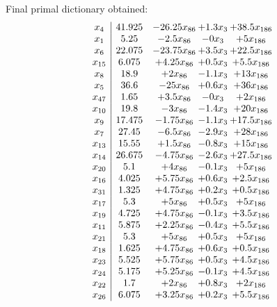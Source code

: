 \documentclass[11pt]{article}
\begin{document}
 Final primal dictionary obtained: 
\[\begin{array}{c| c c@{\hskip 2pt} c@{\hskip 2pt} c@{\hskip 2pt} }
 x_{4}   &  41.925 & -26.25 x_{86} & + 1.3 x_{3} & + 38.5 x_{186}\\
 x_{1}   &  5.25 & -2.5 x_{86} & -0 x_{3} & + 5 x_{186}\\
 x_{6}   &  22.075 & -23.75 x_{86} & + 3.5 x_{3} & + 22.5 x_{186}\\
 x_{15}   &  6.075 & + 4.25 x_{86} & + 0.5 x_{3} & + 5.5 x_{186}\\
 x_{8}   &  18.9 & + 2 x_{86} & -1.1 x_{3} & + 13 x_{186}\\
 x_{5}   &  36.6 & -25 x_{86} & + 0.6 x_{3} & + 36 x_{186}\\
 x_{47}   &  1.65 & + 3.5 x_{86} & -0 x_{3} & + 2 x_{186}\\
 x_{10}   &  19.8 & -3 x_{86} & -1.4 x_{3} & + 20 x_{186}\\
 x_{9}   &  17.475 & -1.75 x_{86} & -1.1 x_{3} & + 17.5 x_{186}\\
 x_{7}   &  27.45 & -6.5 x_{86} & -2.9 x_{3} & + 28 x_{186}\\
 x_{13}   &  15.55 & + 1.5 x_{86} & -0.8 x_{3} & + 15 x_{186}\\
 x_{14}   &  26.675 & -4.75 x_{86} & -2.6 x_{3} & + 27.5 x_{186}\\
 x_{20}   &  5.1 & + 4 x_{86} & -0.1 x_{3} & + 5 x_{186}\\
 x_{16}   &  4.025 & + 5.75 x_{86} & + 0.6 x_{3} & + 2.5 x_{186}\\
 x_{31}   &  1.325 & + 4.75 x_{86} & + 0.2 x_{3} & + 0.5 x_{186}\\
 x_{17}   &  5.3 & + 5 x_{86} & + 0.5 x_{3} & + 5 x_{186}\\
 x_{19}   &  4.725 & + 4.75 x_{86} & -0.1 x_{3} & + 3.5 x_{186}\\
 x_{11}   &  5.875 & + 2.25 x_{86} & -0.4 x_{3} & + 5.5 x_{186}\\
 x_{21}   &  5.3 & + 5 x_{86} & + 0.5 x_{3} & + 5 x_{186}\\
 x_{18}   &  1.625 & + 4.75 x_{86} & + 0.6 x_{3} & + 0.5 x_{186}\\
 x_{23}   &  5.525 & + 5.75 x_{86} & + 0.5 x_{3} & + 4.5 x_{186}\\
 x_{24}   &  5.175 & + 5.25 x_{86} & -0.1 x_{3} & + 4.5 x_{186}\\
 x_{22}   &  1.7 & + 2 x_{86} & + 0.8 x_{3} & + 2 x_{186}\\
 x_{26}   &  6.075 & + 3.25 x_{86} & + 0.2 x_{3} & + 5.5 x_{186}\\

\end{array}\]
\end{document}
